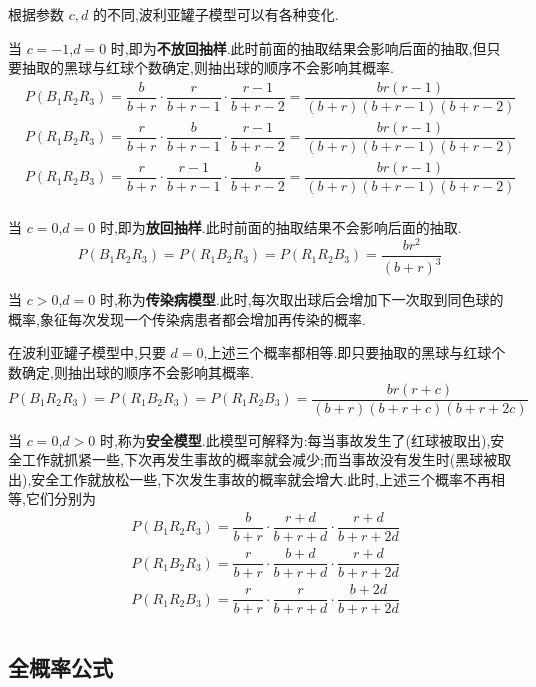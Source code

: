 \begin{note}
    \indent 根据参数 $c,d$ 的不同,波利亚罐子模型可以有各种变化.

    当 $c=-1$,$d=0$ 时,即为\textbf{不放回抽样}.此时前面的抽取结果会影响后面的抽取,但只要抽取的黑球与红球个数确定,则抽出球的顺序不会影响其概率.
    $$
    \begin{aligned}
        & P(B_1 R_2 R_3) = \dfrac{b}{b+r} \cdot \dfrac{r}{b+r-1} \cdot \dfrac{r-1}{b+r-2} = \dfrac{br(r-1)}{(b+r)(b+r-1)(b+r-2)} \\
        & P(R_1 B_2 R_3) = \dfrac{r}{b+r} \cdot \dfrac{b}{b+r-1} \cdot \dfrac{r-1}{b+r-2} = \dfrac{br(r-1)}{(b+r)(b+r-1)(b+r-2)} \\
        & P(R_1 R_2 B_3) = \dfrac{r}{b+r} \cdot \dfrac{r-1}{b+r-1} \cdot \dfrac{b}{b+r-2} = \dfrac{br(r-1)}{(b+r)(b+r-1)(b+r-2)} \\
    \end{aligned}
    $$

    当 $c=0$,$d=0$ 时,即为\textbf{放回抽样}.此时前面的抽取结果不会影响后面的抽取.
    $$
    P(B_1 R_2 R_3) = P(R_1 B_2 R_3) = P(R_1 R_2 B_3) = \dfrac{br^2}{(b+r)^3}
    $$

    当 $c>0$,$d=0$ 时,称为\textbf{传染病模型}.此时,每次取出球后会增加下一次取到同色球的概率,象征每次发现一个传染病患者都会增加再传染的概率.

    在波利亚罐子模型中,只要 $d=0$,上述三个概率都相等.即只要抽取的黑球与红球个数确定,则抽出球的顺序不会影响其概率.
    $$
    P(B_1 R_2 R_3) = P(R_1 B_2 R_3) = P(R_1 R_2 B_3) = \dfrac{br(r+c)}{(b+r)(b+r+c)(b+r+2c)}
    $$

    当 $c=0$,$d>0$ 时,称为\textbf{安全模型}.此模型可解释为:每当事故发生了(红球被取出),安全工作就抓紧一些,下次再发生事故的概率就会减少;而当事故没有发生时(黑球被取出),安全工作就放松一些,下次发生事故的概率就会增大.此时,上述三个概率不再相等,它们分别为
    $$
    \begin{aligned}
        & P(B_1 R_2 R_3) = \dfrac{b}{b+r} \cdot \dfrac{r+d}{b+r+d} \cdot \dfrac{r+d}{b+r+2d} \\
        & P(R_1 B_2 R_3) = \dfrac{r}{b+r} \cdot \dfrac{b+d}{b+r+d} \cdot \dfrac{r+d}{b+r+2d} \\
        & P(R_1 R_2 B_3) = \dfrac{r}{b+r} \cdot \dfrac{r}{b+r+d} \cdot \dfrac{b+2d}{b+r+2d} \\
    \end{aligned}
    $$
\end{note}

\subsection{全概率公式}

